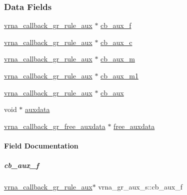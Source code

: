 \subsubsection*{Data Fields}
\begin{DoxyCompactItemize}
\item 
\mbox{\hyperlink{group__grammar_ga4872800fb64a0cc6d861f53efb91ee05}{vrna\+\_\+callback\+\_\+gr\+\_\+rule\+\_\+aux}} $\ast$ \mbox{\hyperlink{group__grammar_a177c06df7c9632acd61e833671e128a4}{cb\+\_\+aux\+\_\+f}}
\item 
\mbox{\hyperlink{group__grammar_ga4872800fb64a0cc6d861f53efb91ee05}{vrna\+\_\+callback\+\_\+gr\+\_\+rule\+\_\+aux}} $\ast$ \mbox{\hyperlink{group__grammar_a6437d8207d52503cfeeec87666652faf}{cb\+\_\+aux\+\_\+c}}
\item 
\mbox{\hyperlink{group__grammar_ga4872800fb64a0cc6d861f53efb91ee05}{vrna\+\_\+callback\+\_\+gr\+\_\+rule\+\_\+aux}} $\ast$ \mbox{\hyperlink{group__grammar_a56558a56dc06c22667bda4ce2a2ddc57}{cb\+\_\+aux\+\_\+m}}
\item 
\mbox{\hyperlink{group__grammar_ga4872800fb64a0cc6d861f53efb91ee05}{vrna\+\_\+callback\+\_\+gr\+\_\+rule\+\_\+aux}} $\ast$ \mbox{\hyperlink{group__grammar_a2ac5c8adff5f9a69a82b21cd7496eea9}{cb\+\_\+aux\+\_\+m1}}
\item 
\mbox{\hyperlink{group__grammar_ga4872800fb64a0cc6d861f53efb91ee05}{vrna\+\_\+callback\+\_\+gr\+\_\+rule\+\_\+aux}} $\ast$ \mbox{\hyperlink{group__grammar_a028eee994dbc35f78e3266d030abed58}{cb\+\_\+aux}}
\item 
void $\ast$ \mbox{\hyperlink{group__grammar_af02cce70c1873f975cf6f60fa37751da}{auxdata}}
\item 
\mbox{\hyperlink{group__grammar_gadc8bec7146fda1ee9276df8fc22d8639}{vrna\+\_\+callback\+\_\+gr\+\_\+free\+\_\+auxdata}} $\ast$ \mbox{\hyperlink{group__grammar_ad558dc65d426484476551479c0705326}{free\+\_\+auxdata}}
\end{DoxyCompactItemize}


\paragraph{Field Documentation}
\mbox{\label{group__grammar_a177c06df7c9632acd61e833671e128a4}} 
\subparagraph{\texorpdfstring{cb\+\_\+aux\+\_\+f}{cb\_aux\_f}}
{\footnotesize\ttfamily \mbox{\hyperlink{group__grammar_ga4872800fb64a0cc6d861f53efb91ee05}{vrna\+\_\+callback\+\_\+gr\+\_\+rule\+\_\+aux}}$\ast$ vrna\+\_\+gr\+\_\+aux\+\_\+s\+::cb\+\_\+aux\+\_\+f}

